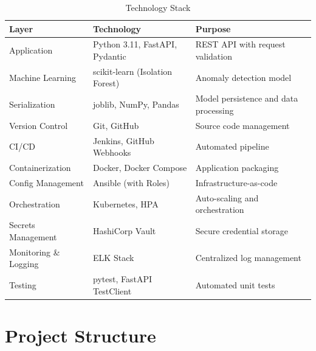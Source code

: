 \documentclass[12pt,a4paper]{article}
\begin{document}
\begin{table}[H]
\centering
\caption{Technology Stack}
\begin{tabular}{@{}lll@{}}
\toprule
\textbf{Layer} & \textbf{Technology} & \textbf{Purpose} \\
\midrule
Application & Python 3.11, FastAPI, Pydantic & REST API with request validation \\
Machine Learning & scikit-learn (Isolation Forest) & Anomaly detection model \\
Serialization & joblib, NumPy, Pandas & Model persistence and data processing \\
Version Control & Git, GitHub & Source code management \\
CI/CD & Jenkins, GitHub Webhooks & Automated pipeline \\
Containerization & Docker, Docker Compose & Application packaging \\
Config Management & Ansible (with Roles) & Infrastructure-as-code \\
Orchestration & Kubernetes, HPA & Auto-scaling and orchestration \\
Secrets Management & HashiCorp Vault & Secure credential storage \\
Monitoring \& Logging & ELK Stack & Centralized log management \\
Testing & pytest, FastAPI TestClient & Automated unit tests \\
\bottomrule
\end{tabular}
\end{table}

\section{Project Structure}
\end{document}
